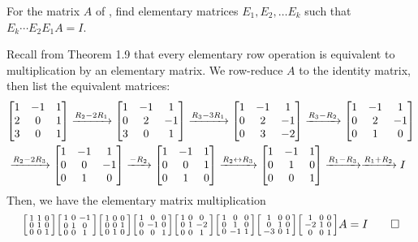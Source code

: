 \documentclass[notes]{agony}
\begin{document}
\begin{xca}
  For the matrix $A$ of , find elementary matrices $E_1, E_2, \dotsc E_k$
  such that $E_k \dotsm E_2 E_1 A = I$.
\end{xca}
\begin{sol}
  Recall from Theorem 1.9 that every elementary row operation is equivalent to multiplication
  by an elementary matrix.
  We row-reduce $A$ to the identity matrix, then list the equivalent matrices:
  \begin{equation*}
    \begin{split}
      & \mqty[1&-1&1 \\ 2&0&1 \\ 3&0&1]
      \xto{R_2 - 2R_1} \mqty[1&-1&1 \\ 0&2&-1 \\ 3&0&1]
      \xto{R_3 - 3R_1} \mqty[1&-1&1 \\ 0&2&-1 \\ 0&3&-2]
      \xto{R_3 - R_2} \mqty[1&-1&1 \\ 0&2&-1 \\ 0&1&0] \\
      & \xto{R_2 - 2R_3} \mqty[1&-1&1 \\ 0&0&-1 \\ 0&1&0]
      \xto{-R_2} \mqty[1&-1&1 \\ 0&0&1 \\ 0&1&0]
      \xto{R_2 \harr R_3} \mqty[1&-1&1 \\ 0&1&0 \\ 0&0&1]
      \xto{R_1 - R_3} \xto{R_1 + R_2} I
    \end{split}
  \end{equation*}
  Then, we have the elementary matrix multiplication
  \begin{equation*}
    \smqty[1&1&0\\0&1&0\\0&0&1]\smqty[1&0&-1\\0&1&0\\0&0&1]\smqty[1&0&0\\0&0&1\\0&1&0]
    \smqty[1&0&0\\0&-1&0\\0&0&1]\smqty[1&0&0\\0&1&-2\\0&0&1]\smqty[1&0&0\\0&1&0\\0&-1&1]
    \smqty[1&0&0\\0&1&0\\-3&0&1]\smqty[1&0&0\\-2&1&0\\0&0&1]A = I \qedhere
  \end{equation*}
\end{sol}
\end{document}
